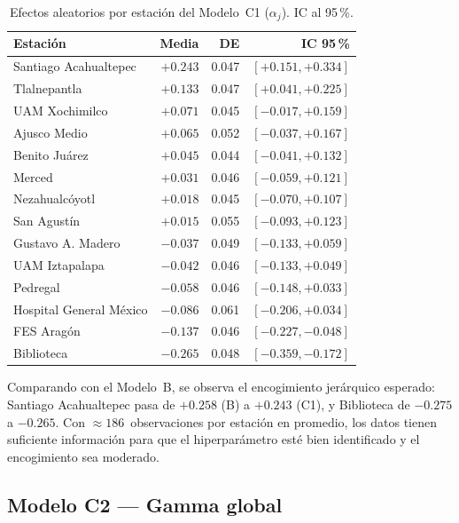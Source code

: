 ﻿\documentclass[12pt]{article}
\begin{document}
\begin{table}[H]
\centering
\caption{Efectos aleatorios por estaci\'on del Modelo~C1 ($\alpha_j$).
         IC al 95\,\%.}
\label{tab:alphaj_C1}
\small
\begin{tabular}{>{\raggedright\arraybackslash}p{5.5cm}rrr}
\toprule
Estaci\'on & Media & DE & IC 95\,\% \\
\midrule
Santiago Acahualtepec   & $+0.243$ & 0.047 & $[+0.151,+0.334]$ \\
Tlalnepantla            & $+0.133$ & 0.047 & $[+0.041,+0.225]$ \\
UAM Xochimilco          & $+0.071$ & 0.045 & $[-0.017,+0.159]$ \\
Ajusco Medio            & $+0.065$ & 0.052 & $[-0.037,+0.167]$ \\
Benito Ju\'arez         & $+0.045$ & 0.044 & $[-0.041,+0.132]$ \\
Merced                  & $+0.031$ & 0.046 & $[-0.059,+0.121]$ \\
Nezahualc\'oyotl        & $+0.018$ & 0.045 & $[-0.070,+0.107]$ \\
San Agust\'in           & $+0.015$ & 0.055 & $[-0.093,+0.123]$ \\
Gustavo A. Madero       & $-0.037$ & 0.049 & $[-0.133,+0.059]$ \\
UAM Iztapalapa          & $-0.042$ & 0.046 & $[-0.133,+0.049]$ \\
Pedregal                & $-0.058$ & 0.046 & $[-0.148,+0.033]$ \\
Hospital General M\'exico& $-0.086$ & 0.061 & $[-0.206,+0.034]$ \\
FES Arag\'on            & $-0.137$ & 0.046 & $[-0.227,-0.048]$ \\
Biblioteca              & $-0.265$ & 0.048 & $[-0.359,-0.172]$ \\
\bottomrule
\end{tabular}
\normalsize
\end{table}

Comparando con el Modelo~B, se observa el encogimiento jer\'arquico
esperado: Santiago Acahualtepec pasa de $+0.258$ (B) a $+0.243$ (C1),
y Biblioteca de $-0.275$ a $-0.265$.
Con $\approx 186$~observaciones por estaci\'on en promedio, los datos
tienen suficiente informaci\'on para que el hiperpar\'ametro est\'e bien
identificado y el encogimiento sea moderado.


\subsection{Modelo C2 --- Gamma global}
\end{document}
